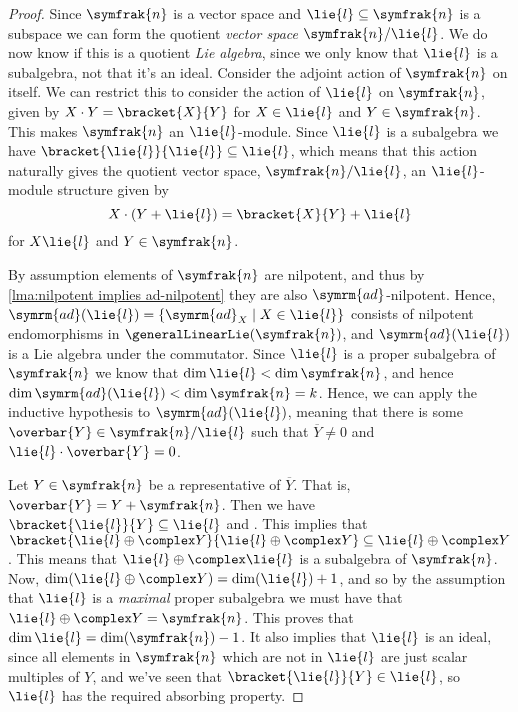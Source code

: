 \documentclass[fleqn]{NotesClass}
\newcommand{\ad}{\symrm{ad}}
\newcommand{\nilpotentLie}{\symfrak{n}}
\begin{document}
\begin{thm}{}{}
\begin{proof}
            Since \(\nilpotentLie\) is a vector space and \(\lie{l} \subseteq \nilpotentLie\) is a subspace we can form the quotient \emph{vector space} \(\nilpotentLie/\lie{l}\).
            We do now know if this is a quotient \emph{Lie algebra}, since we only know that \(\lie{l}\) is a subalgebra, not that it's an ideal.
            Consider the adjoint action of \(\nilpotentLie\) on itself.
            We can restrict this to consider the action of \(\lie{l}\) on \(\nilpotentLie\), given by \(X \cdot Y = \bracket{X}{Y}\) for \(X \in \lie{l}\) and \(Y \in \nilpotentLie\).
            This makes \(\nilpotentLie\) an \(\lie{l}\)-module.
            Since \(\lie{l}\) is a subalgebra we have \(\bracket{\lie{l}}{\lie{l}} \subseteq \lie{l}\), which means that this action naturally gives the quotient vector space, \(\nilpotentLie/\lie{l}\), an \(\lie{l}\)-module structure given by
            \begin{equation}
                X \cdot (Y + \lie{l}) = \bracket{X}{Y} + \lie{l}
            \end{equation}
            for \(X \lie{l}\) and \(Y \in \nilpotentLie\).
            
            By assumption elements of \(\nilpotentLie\) are nilpotent, and thus by \cref{lma:nilpotent implies ad-nilpotent} they are also \(\ad\)-nilpotent.
            Hence, \(\ad(\lie{l}) = \{\ad_X \mid X \in \lie{l}\}\) consists of nilpotent endomorphisms in \(\generalLinearLie(\nilpotentLie)\), and \(\ad(\lie{l})\) is a Lie algebra under the commutator.
            Since \(\lie{l}\) is a proper subalgebra of \(\nilpotentLie\) we know that \(\dim \lie{l} < \dim \nilpotentLie\), and hence \(\dim \ad(\lie{l}) < \dim \nilpotentLie = k\).
            Hence, we can apply the inductive hypothesis to \(\ad(\lie{l})\), meaning that there is some \(\overbar{Y} \in \nilpotentLie/\lie{l}\) such that \(\overbar{Y} \ne 0\) and \(\lie{l} \cdot \overbar{Y} = 0\).
            
            Let \(Y \in \nilpotentLie\) be a representative of \(\overbar{Y}\).
            That is, \(\overbar{Y} = Y + \nilpotentLie\).
            Then we have \(\bracket{\lie{l}}{Y} \subseteq \lie{l}\) and \(\).
            This implies that \(\bracket{\lie{l} \oplus \complex Y}{\lie{l} \oplus \complex Y} \subseteq \lie{l} \oplus \complex Y\).
            This means that \(\lie{l} \oplus \complex \lie{l}\) is a subalgebra of \(\nilpotentLie\).
            Now, \(\dim(\lie{l} \oplus \complex Y) = \dim(\lie{l}) + 1\), and so by the assumption that \(\lie{l}\) is a \emph{maximal} proper subalgebra we must have that \(\lie{l} \oplus \complex Y = \nilpotentLie\).
            This proves that \(\dim \lie{l} = \dim(\nilpotentLie) - 1\).
            It also implies that \(\lie{l}\) is an ideal, since all elements in \(\nilpotentLie\) which are not in \(\lie{l}\) are just scalar multiples of \(Y\), and we've seen that \(\bracket{\lie{l}}{Y} \in \lie{l}\), so \(\lie{l}\) has the required absorbing property.
            

\end{proof}
\end{thm}
\end{document}
